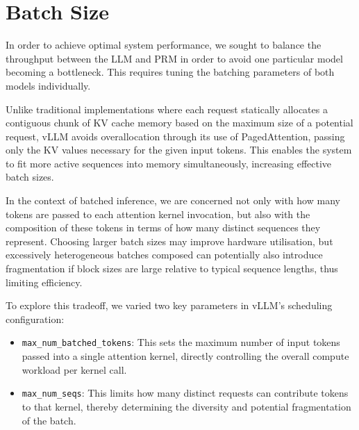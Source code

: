 \documentclass[12pt,twoside]{report}
\begin{document}
\section{Batch Size}

In order to achieve optimal system performance, we sought to balance the throughput between the LLM and PRM in order to avoid one particular model becoming a bottleneck.
This requires tuning the batching parameters of both models individually.

Unlike traditional implementations where each request statically allocates a contiguous chunk of KV cache memory based on the maximum size of a potential request, vLLM avoids overallocation through its use of PagedAttention, passing only the KV values necessary for the given input tokens.
This enables the system to fit more active sequences into memory simultaneously, increasing effective batch sizes.

In the context of batched inference, we are concerned not only with how many tokens are passed to each attention kernel invocation, but also with the composition of these tokens in terms of how many distinct sequences they represent.
Choosing larger batch sizes may improve hardware utilisation, but excessively heterogeneous batches composed can potentially also introduce fragmentation if block sizes are large relative to typical sequence lengths, thus limiting efficiency.

To explore this tradeoff, we varied two key parameters in vLLM’s scheduling configuration:

\begin{itemize}
  \item \texttt{max\_num\_batched\_tokens}: This sets the maximum number of input tokens passed into a single attention kernel, directly controlling the overall compute workload per kernel call.
  \item \texttt{max\_num\_seqs}: This limits how many distinct requests can contribute tokens to that kernel, thereby determining the diversity and potential fragmentation of the batch.
\end{itemize}
\end{document}
